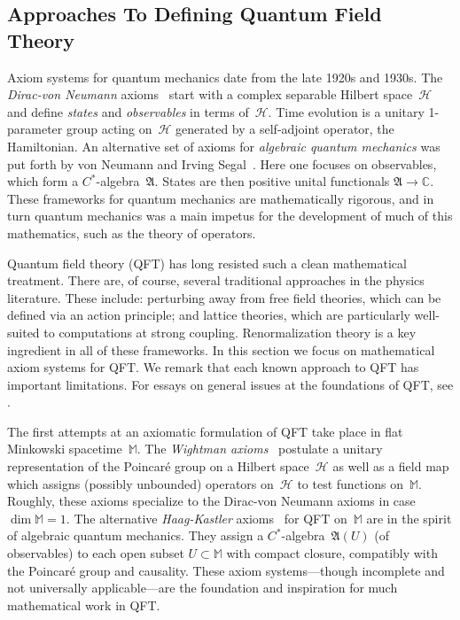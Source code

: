 \documentclass[12pt]{article}
\begin{document}
\subsection{Approaches To Defining Quantum Field Theory}

Axiom systems for quantum mechanics date from the late 1920s and 1930s.  The
\emph{Dirac-von Neumann} axioms~\cite{Dirac,vNeumann,Mackey} start with a
complex separable Hilbert space~$\mathscr{H}$ and define \emph{states} and
\emph{observables} in terms of~$\mathscr{H}$.  Time evolution is a unitary
1-parameter group acting on~$\mathscr{H}$ generated by a self-adjoint operator, the
Hamiltonian.  An alternative set of axioms for \emph{algebraic quantum
mechanics} was put forth by von Neumann and Irving Segal~\cite{ISegal}.  Here
one focuses on observables, which form a $C^*$-algebra~$\mathfrak{A}$.
States are then positive unital functionals $\mathfrak{A}\to \mathbb{C}$.
These frameworks for quantum mechanics are mathematically rigorous, and in
turn quantum mechanics was a main impetus for the development of much of this
mathematics, such as the theory of operators.
 
Quantum field theory (QFT) has long resisted such a clean mathematical
treatment. There are, of course, several traditional approaches in the
physics literature.  These include: perturbing away from free field theories,
which can be defined via an action principle; and lattice theories, which are 
particularly well-suited to computations at strong coupling.  Renormalization
theory is a key ingredient in all of these frameworks. In this
section we focus on mathematical axiom systems for QFT.  We remark that each 
known approach to QFT has important limitations.  
For essays on general issues at the foundations of QFT, see \cite{conceptual}.

The first attempts at an axiomatic formulation of QFT take place in flat
Minkowski spacetime~$\mathbb{M}$.  The \emph{Wightman axioms}~\cite{PCT}
postulate a unitary representation of the Poincar{\'e} group on a Hilbert
space~$\mathscr{H}$ as well as a field map which assigns (possibly unbounded)
operators on~$\mathscr{H}$ to test functions on~$\mathbb{M}$.  Roughly, these
axioms specialize to the Dirac-von Neumann axioms in case $\dim\mathbb{M}=1$.
The alternative \emph{Haag-Kastler} axioms~\cite{HaagKastler} for QFT
on~$\mathbb{M}$ are in the spirit of algebraic quantum mechanics.  They
assign a $C^*$-algebra~$\mathfrak{A}(U)$ (of observables) to each open subset
$U\subset \mathbb{M}$ with compact closure, compatibly with the Poincar{\'e}
group and causality.  These axiom systems---though incomplete and not universally applicable---are the foundation and inspiration for much
mathematical work in QFT.  
 
\end{document}
